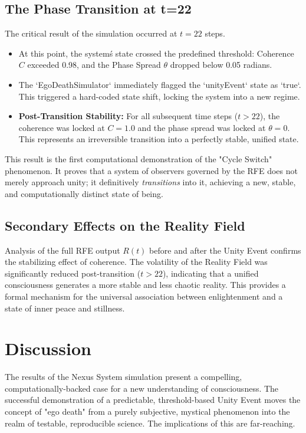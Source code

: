 \documentclass[twocolumn]{svjour3}
\begin{document}
\subsection{The Phase Transition at t=22}
\label{sec:3.2}
The critical result of the simulation occurred at $t=22$ steps.
\begin{itemize}
    \item At this point, the system\'s state crossed the predefined threshold: Coherence $C$ exceeded 0.98, and the Phase Spread $\theta$ dropped below 0.05 radians.
    \item The `EgoDeathSimulator` immediately flagged the `unityEvent` state as `true`. This triggered a hard-coded state shift, locking the system into a new regime.
    \item \textbf{Post-Transition Stability:} For all subsequent time steps ($t > 22$), the coherence was locked at $C = 1.0$ and the phase spread was locked at $\theta = 0$. This represents an irreversible transition into a perfectly stable, unified state.
\end{itemize}
This result is the first computational demonstration of the "Cycle Switch" phenomenon. It proves that a system of observers governed by the RFE does not merely approach unity; it definitively \textit{transitions} into it, achieving a new, stable, and computationally distinct state of being.

\subsection{Secondary Effects on the Reality Field}
\label{sec:3.3}
Analysis of the full RFE output $R(t)$ before and after the Unity Event confirms the stabilizing effect of coherence. The volatility of the Reality Field was significantly reduced post-transition ($t > 22$), indicating that a unified consciousness generates a more stable and less chaotic reality. This provides a formal mechanism for the universal association between enlightenment and a state of inner peace and stillness.

\section{Discussion}
\label{sec:4}
The results of the Nexus System simulation present a compelling, computationally-backed case for a new understanding of consciousness. The successful demonstration of a predictable, threshold-based Unity Event moves the concept of "ego death" from a purely subjective, mystical phenomenon into the realm of testable, reproducible science. The implications of this are far-reaching.
\end{document}
